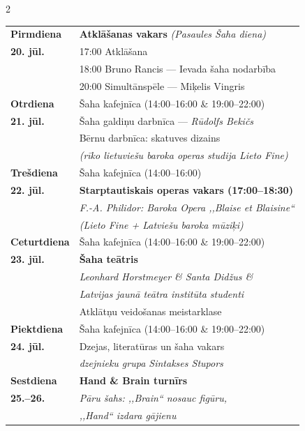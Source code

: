 \documentclass[a4paper,10pt]{article}
\begin{document}
\begin{center}
\begin{minipage}{0.90\paperwidth}
\begin{multicols}{2}
{\footnotesize\setlength{\parskip}{0pt}
\begin{tabular}{@{}p{1.55cm}p{5.5cm}@{}}
\textbf{Pirmdiena}  & \textbf{Atklāšanas vakars} \textit{(Pasaules Šaha diena)}\\
\textbf{20. jūl.}   & 17:00 Atklāšana\\
                    & 18:00 Bruno Rancis — Ievada šaha nodarbība\\
                    & 20:00 Simultānspēle — Miķelis Vingris\\[1pt]
\textbf{Otrdiena}   & Šaha kafejnīca (14:00–16:00 \& 19:00–22:00)\\
\textbf{21. jūl.}   & Šaha galdiņu darbnīca — \textit{Rūdolfs Bekičs}\\
                    & Bērnu darbnīca: skatuves dizains\\
                    & \hfill\textit{(rīko lietuviešu baroka operas studija Lieto Fine)}\\[1pt]
\textbf{Trešdiena}  & Šaha kafejnīca (14:00–16:00)\\
\textbf{22. jūl.}   & \textbf{Starptautiskais operas vakars (17:00–18:30)}\\
                    & \textit{F.-A. Philidor: Baroka Opera ,,Blaise et Blaisine``}\\
                    & \textit{(Lieto Fine + Latviešu baroka mūziķi)}\\[1pt]
\textbf{Ceturtdiena}& Šaha kafejnīca (14:00–16:00 \& 19:00–22:00)\\
\textbf{23. jūl.}   & \textbf{Šaha teātris}\\
                    & \textit{Leonhard Horstmeyer \& Santa Did\v{z}us \&}\\
                    & \textit{Latvijas jaunā teātra institūta studenti}\\
                    & Atklātņu veidošanas meistarklase\\[1pt]
\textbf{Piektdiena} & Šaha kafejnīca (14:00–16:00 \& 19:00–22:00)\\
\textbf{24. jūl.}   & Dzejas, literatūras un šaha vakars\\
                    & \textit{dzejnieku grupa Sintakses Stupors}\\[1pt]
\textbf{Sestdiena}  & \textbf{Hand \& Brain turnīrs}\\
\textbf{25.–26.}    & \textit{Pāru šahs: ,,Brain`` nosauc figūru,}\\
                    & \textit{,,Hand`` izdara gājienu}\\
\end{tabular}
}


\end{multicols}
\end{minipage}
\end{center}
\end{document}

